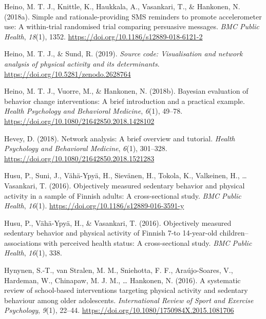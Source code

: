 \documentclass[british,man]{apa6}
\begin{document}
\leavevmode\hypertarget{ref-heinoSimpleRationaleprovidingSMS2018}{}%
Heino, M. T. J., Knittle, K., Haukkala, A., Vasankari, T., \& Hankonen, N. (2018a). Simple and rationale-providing SMS reminders to promote accelerometer use: A within-trial randomised trial comparing persuasive messages. \emph{BMC Public Health}, \emph{18}(1), 1352. \url{https://doi.org/10.1186/s12889-018-6121-2}

\leavevmode\hypertarget{ref-heinoSourceCodeVisualisation2019}{}%
Heino, M. T. J., \& Sund, R. (2019). \emph{Source code: Visualisation and network analysis of physical activity and its determinants}. \url{https://doi.org/10.5281/zenodo.2628764}

\leavevmode\hypertarget{ref-heinoBayesianEvaluationBehavior2018}{}%
Heino, M. T. J., Vuorre, M., \& Hankonen, N. (2018b). Bayesian evaluation of behavior change interventions: A brief introduction and a practical example. \emph{Health Psychology and Behavioral Medicine}, \emph{6}(1), 49--78. \url{https://doi.org/10.1080/21642850.2018.1428102}

\leavevmode\hypertarget{ref-heveyNetworkAnalysisBrief2018}{}%
Hevey, D. (2018). Network analysis: A brief overview and tutorial. \emph{Health Psychology and Behavioral Medicine}, \emph{6}(1), 301--328. \url{https://doi.org/10.1080/21642850.2018.1521283}

\leavevmode\hypertarget{ref-husuObjectivelyMeasuredSedentary2016a}{}%
Husu, P., Suni, J., Vähä-Ypyä, H., Sievänen, H., Tokola, K., Valkeinen, H., \ldots{} Vasankari, T. (2016). Objectively measured sedentary behavior and physical activity in a sample of Finnish adults: A cross-sectional study. \emph{BMC Public Health}, \emph{16}(1). \url{https://doi.org/10.1186/s12889-016-3591-y}

\leavevmode\hypertarget{ref-husuObjectivelyMeasuredSedentary2016}{}%
Husu, P., Vähä-Ypyä, H., \& Vasankari, T. (2016). Objectively measured sedentary behavior and physical activity of Finnish 7-to 14-year-old children--associations with perceived health status: A cross-sectional study. \emph{BMC Public Health}, \emph{16}(1), 338.

\leavevmode\hypertarget{ref-hynynenSystematicReviewSchoolbased2016}{}%
Hynynen, S.-T., van Stralen, M. M., Sniehotta, F. F., Araújo-Soares, V., Hardeman, W., Chinapaw, M. J. M., \ldots{} Hankonen, N. (2016). A systematic review of school-based interventions targeting physical activity and sedentary behaviour among older adolescents. \emph{International Review of Sport and Exercise Psychology}, \emph{9}(1), 22--44. \url{https://doi.org/10.1080/1750984X.2015.1081706}
\end{document}

